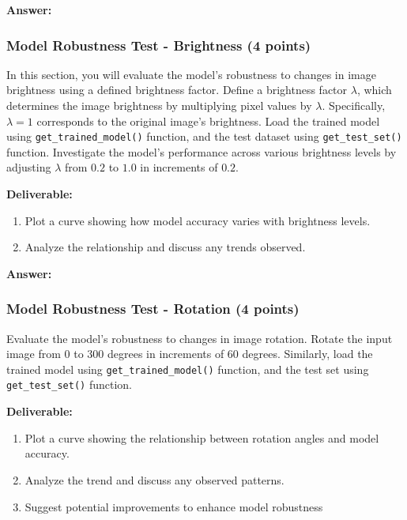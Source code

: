 \documentclass[11pt, oneside]{article}   	%
\begin{document}
\begin{answerbox} \textbf{Answer:} \vspace*{1cm}

\end{answerbox}

\subsubsection*{Model Robustness Test - Brightness (4 points)}
In this section, you will evaluate the model's robustness to changes in image brightness using a defined brightness factor.
Define a brightness factor $\lambda$, which determines the image brightness by multiplying pixel values by $\lambda$. Specifically, $\lambda = 1$ corresponds to the original image's brightness.
Load the trained model using \texttt{get\_trained\_model()} function, and the test dataset using \texttt{get\_test\_set()} function.  Investigate the model's performance across various brightness levels by adjusting $\lambda$ from $0.2$ to $1.0$ in increments of $0.2$. 

\noindent\textbf{Deliverable:}

\begin{enumerate}
    \item  Plot a curve showing how model accuracy varies with brightness levels.
    \item Analyze the relationship and discuss any trends observed.
\end{enumerate}


\begin{answerbox} \textbf{Answer:} \vspace*{1cm}

\end{answerbox}


\subsubsection*{Model Robustness Test - Rotation (4 points)}

Evaluate the model's robustness to changes in image rotation. Rotate the input image from $0$ to $300$ degrees in increments of $60$ degrees. 
Similarly, load the trained model using \texttt{get\_trained\_model()} function, and the test set using \texttt{get\_test\_set()} function. 

\noindent\textbf{Deliverable:}

\begin{enumerate}
    \item Plot a curve showing the relationship between rotation angles and model accuracy.
    \item Analyze the trend and discuss any observed patterns.
    \item Suggest potential improvements to enhance model robustness
\end{enumerate}
\end{document}
